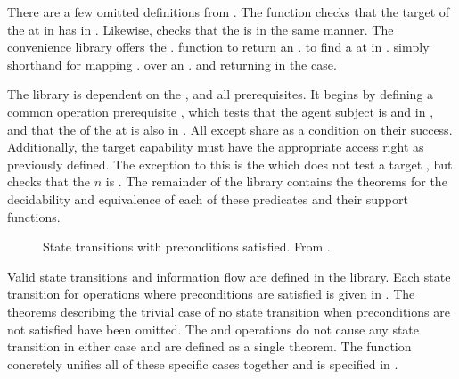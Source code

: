 There are a few omitted definitions from  .
The  function checks that the target of the \TMcap{} at \TMidx{}  in \TMobj{}  has \TMobjLabel{} \TMalive{} in \TMsystemState{} .
Likewise,  checks that the \TMobjType{} is \TMactive{} in the same manner.
The \TMsystemState{} convenience library offers the \COQSC{}. function to return an  \COQCap{}. to find a \TMcap{} at \TMidx{}  in \TMobj{} .
\COQoptionHasRight{} simply shorthand for mapping \COQCC{}.\COQhasRight{} over an  \COQCap{}. and returning \COQFalse{} in the  case.

The \COQSemanticsDefinitions{} library is dependent on the \COQSystemStateType{}, and all prerequisites.
It begins by defining a common operation prerequisite , which tests that the agent subject  is \TMalive{} and \TMactive{} in \TMsystemState{} , and that the \TMcapTarget{} of the \TMcap{} at \TMidx{}  is also \NMalive{} in .
All \TMops{} except \TMcreate{} share \COQpreReq{} as a condition on their success.
Additionally, the target capability must have the appropriate access right as previously defined.
The exception to this is the  which does not test a target \TMcap{}, but checks that the \TMobj{} \(n\) is \TMunborn{}.
The remainder of the library contains the theorems for the decidability and equivalence of each of these predicates and their support functions.  

\begin{figure}
  \COQDOCValidStateTransitions{}
  \caption{State transitions with preconditions satisfied. From \COQSemantics{}. \label{fig:embed:validStateTransitions}}
\end{figure}


Valid state transitions and information flow are defined in the \COQSemantics{} library.
Each state transition for operations where preconditions are satisfied is given in .
The theorems describing the trivial case of no state transition when preconditions are not satisfied have been omitted.
The \NMread{} and \NMwrite{} operations do not cause any state transition in either case and are defined as a single theorem.
The \COQdoOp{} function concretely unifies all of these specific cases together and is specified in .

